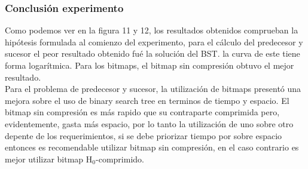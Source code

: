 \documentclass[11pt]{article}
\begin{document}
\subsubsection{Conclusión experimento}
Como podemos ver en la figura 11 y 12, los resultados obtenidos comprueban la hipótesis formulada al comienzo del experimento, para el cálculo del predecesor y sucesor el peor resultado obtenido fué la solución del BST. la curva de este tiene forma logarítmica. Para los bitmaps, el bitmap sin compresión obtuvo el mejor resultado.\\

Para el problema de predecesor y sucesor, la utilización de bitmaps presentó una mejora sobre el uso de binary search tree en terminos de tiempo y espacio. El bitmap sin compresión es más rapido que su contraparte comprimida pero, evidentemente, gasta más espacio, por lo tanto la utilización de uno sobre otro depente de los requerimientos, si se debe priorizar tiempo por sobre espacio entonces es recomendable utilizar bitmap sin compresión, en el caso contrario es mejor utilizar bitmap H$_{0}$-comprimido.
\end{document}
